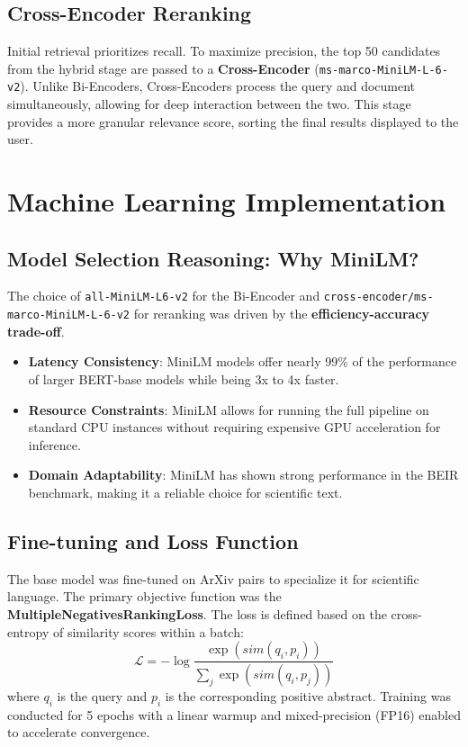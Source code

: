 \documentclass[11pt,a4paper]{article}
\begin{document}
\subsection{Cross-Encoder Reranking}
Initial retrieval prioritizes recall. To maximize precision, the top 50 candidates from the hybrid stage are passed to a \textbf{Cross-Encoder} (\texttt{ms-marco-MiniLM-L-6-v2}). Unlike Bi-Encoders, Cross-Encoders process the query and document simultaneously, allowing for deep interaction between the two. This stage provides a more granular relevance score, sorting the final results displayed to the user.

\section{Machine Learning Implementation}
\subsection{Model Selection Reasoning: Why MiniLM?}
The choice of \texttt{all-MiniLM-L6-v2} for the Bi-Encoder and \texttt{cross-encoder/ms-marco-MiniLM-L-6-v2} for reranking was driven by the \textbf{efficiency-accuracy trade-off}. 
\begin{itemize}
    \item \textbf{Latency Consistency}: MiniLM models offer nearly 99\% of the performance of larger BERT-base models while being 3x to 4x faster.
    \item \textbf{Resource Constraints}: MiniLM allows for running the full pipeline on standard CPU instances without requiring expensive GPU acceleration for inference.
    \item \textbf{Domain Adaptability}: MiniLM has shown strong performance in the BEIR benchmark, making it a reliable choice for scientific text.
\end{itemize}

\subsection{Fine-tuning and Loss Function}
The base model was fine-tuned on ArXiv pairs to specialize it for scientific language. The primary objective function was the \textbf{MultipleNegativesRankingLoss}. The loss is defined based on the cross-entropy of similarity scores within a batch:
\begin{equation}
    \mathcal{L} = - \log \frac{\exp(sim(q_i, p_i))}{\sum_{j} \exp(sim(q_i, p_j))}
\end{equation}
where $q_i$ is the query and $p_i$ is the corresponding positive abstract. Training was conducted for 5 epochs with a linear warmup and mixed-precision (FP16) enabled to accelerate convergence.
\end{document}
